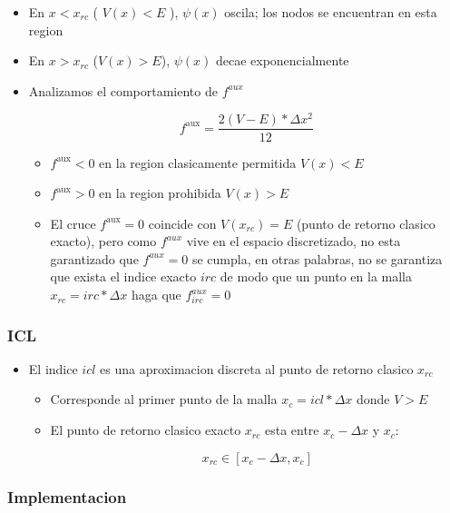 \documentclass[11pt]{article}
\begin{document}
\begin{itemize}
\item En \(x < x_{rc}\) ( \(V(x) < E\) ), \(\psi(x)\) oscila; los nodos se encuentran en esta region

\item En \(x> x_{rc}\) (\(V(x) > E\)), \(\psi(x)\) decae exponencialmente

\item Analizamos el comportamiento de \(f^{aux}\)

\[ f^{\text{aux}} = \frac{2(V-E) * \Delta x^2}{12} \]

\begin{itemize}
\item \(f^{\text{aux}} < 0\) en la region clasicamente permitida \(V(x)<E\)

\item \(f^{\text{aux}} > 0\) en la region prohibida \(V(x) > E\)

\item El cruce \(f^{\text{aux}} = 0\) coincide con \(V(x_{rc}) = E\) (punto de retorno clasico exacto), pero como \(f^{aux}\) vive en el espacio discretizado, no esta garantizado que \(f^{aux} = 0\) se cumpla, en otras palabras, no se garantiza que exista el indice exacto \(irc\) de modo que un punto en la malla \(x_{rc} = irc*\Delta x\) haga que \(f_{irc}^{aux} = 0\)
\end{itemize}
\end{itemize}
\subsubsection{ICL}
\label{sec:orgf7c7f04}

\begin{itemize}
\item El indice \(icl\) es una aproximacion discreta al punto de retorno clasico \(x_{rc}\)

\begin{itemize}
\item Corresponde al primer punto de la malla \(x_c = icl * \Delta x\) donde \(V > E\)

\item El punto de retorno clasico exacto \(x_{rc}\) esta entre \(x_c - \Delta x\) y \(x_c\):

\[ x_{rc} \in [x_c-\Delta x, x_c] \]
\end{itemize}
\end{itemize}
\subsubsection{Implementacion}
\label{sec:org43058de}
\end{document}
